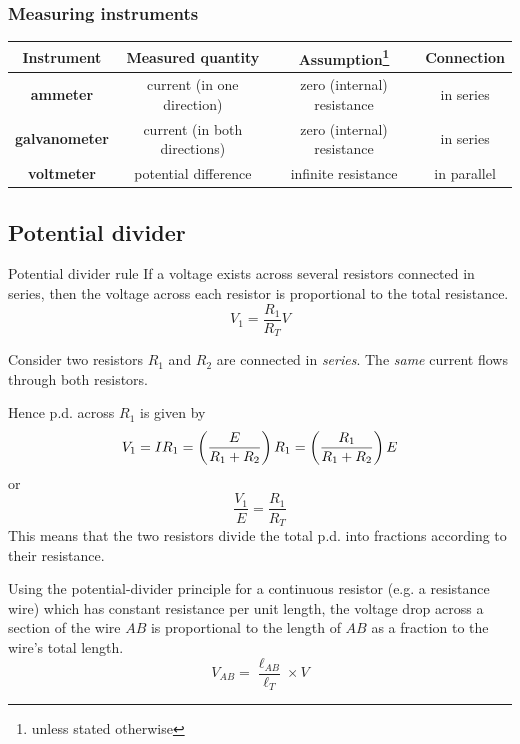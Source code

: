 \subsubsection{Measuring instruments}
\begin{table}[H]
\centering
\begin{tabular}{|c|c|c|c|}
\hline
\textbf{Instrument} & \textbf{Measured quantity} & \textbf{Assumption}\footnote{unless stated otherwise} & \textbf{Connection} \\
\hline
\textbf{ammeter} & current (in one direction) & zero (internal) resistance & in series \\
\textbf{galvanometer} & current (in both directions) & zero (internal) resistance & in series \\
\textbf{voltmeter} & potential difference & infinite resistance & in parallel \\
\hline
\end{tabular}
\end{table}

\subsection{Potential divider}
\begin{defn}{Potential divider rule}{}
If a voltage exists across several resistors connected in series, then the voltage across each resistor is proportional to the total resistance.
\begin{equation}
V_1 = \frac{R_1}{R_T}V
\end{equation}
\end{defn}

\begin{derivation}
Consider two resistors $R_1$ and $R_2$ are connected in \emph{series}. The \emph{same} current flows through both resistors.

Hence p.d. across $R_1$ is given by
\[ V_1 = IR_1 = \left(\frac{E}{R_1+R_2}\right)R_1 = \left(\frac{R_1}{R_1+R_2}\right)E \]
or
\[ \frac{V_1}{E} = \frac{R_1}{R_T} \]
This means that the two resistors divide the total p.d. into fractions according to their resistance.
\end{derivation}

Using the potential-divider principle for a continuous resistor (e.g. a resistance wire) which has constant resistance per unit length, the voltage drop across a section of the wire $AB$ is proportional to the length of $AB$ as a fraction to the wire's total length.
\[ V_{AB} = \frac{\ell_{AB}}{\ell_T} \times V \]


